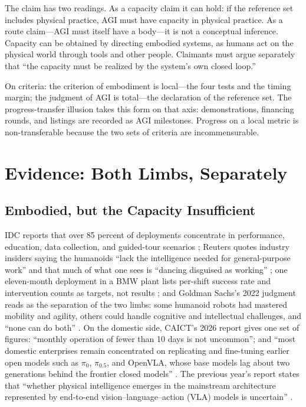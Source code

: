 \documentclass[10pt]{article}
\begin{document}
The claim has two readings. As a capacity claim it can hold: if the reference set includes physical practice, AGI must have capacity in physical practice. As a route claim---AGI must itself have a body---it is not a conceptual inference. Capacity can be obtained by directing embodied systems, as humans act on the physical world through tools and other people. Claimants must argue separately that ``the capacity must be realized by the system's own closed loop.''

On criteria: the criterion of embodiment is local---the four tests and the timing margin; the judgment of AGI is total---the declaration of the reference set. The progress-transfer illusion \cite{yu2026two} takes this form on that axis: demonstrations, financing rounds, and listings are recorded as AGI milestones. Progress on a local metric is non-transferable because the two sets of criteria are incommensurable.

\section{Evidence: Both Limbs, Separately}\label{sec:evidence}

\subsection{Embodied, but the Capacity Insufficient}\label{sec:capacity}

IDC reports that over 85 percent of deployments concentrate in performance, education, data collection, and guided-tour scenarios \cite{idc2026}; Reuters quotes industry insiders saying the humanoids ``lack the intelligence needed for general-purpose work'' and that much of what one sees is ``dancing disguised as working'' \cite{reuters2026}; one eleven-month deployment in a BMW plant lists per-shift success rate and intervention counts as targets, not results \cite{figure_bmw}; and Goldman Sachs's 2022 judgment reads as the separation of the two limbs: some humanoid robots had mastered mobility and agility, others could handle cognitive and intellectual challenges, and ``none can do both'' \cite{goldman2022}. On the domestic side, CAICT's 2026 report gives one set of figures: ``monthly operation of fewer than 10 days is not uncommon''; and ``most domestic enterprises remain concentrated on replicating and fine-tuning earlier open models such as $\pi_0$, $\pi_{0.5}$, and OpenVLA, whose base models lag about two generations behind the frontier closed models'' \cite{caict2026}. The previous year's report states that ``whether physical intelligence emerges in the mainstream architecture represented by end-to-end vision--language--action (VLA) models is uncertain'' \cite{caict2025}.
\end{document}
